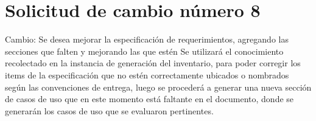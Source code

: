 \section{Solicitud de cambio número 8}
Cambio: Se desea mejorar la especificación de requerimientos, agregando las secciones que falten y mejorando las que estén
Se utilizará el conocimiento recolectado en la instancia de generación del inventario, para poder corregir los items de la especificación que no estén correctamente ubicados o nombrados según las convenciones de entrega, luego se procederá a generar una nueva sección de casos de uso que en este momento está faltante en el documento, donde se generarán los casos de uso que se evaluaron pertinentes.

